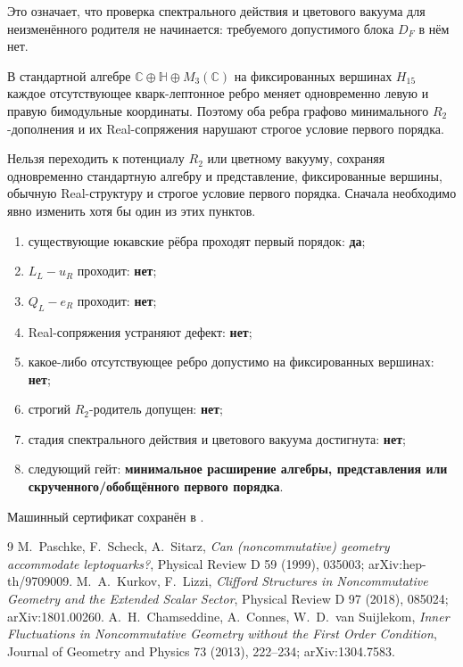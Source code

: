 Это означает, что проверка спектрального действия и цветового вакуума для
неизменённого родителя не начинается: требуемого допустимого блока $D_F$ в
нём нет.

\begin{theorem}
В стандартной алгебре $\mathbb C\oplus\mathbb H\oplus M_3(\mathbb C)$ на
фиксированных вершинах $H_{15}$ каждое отсутствующее кварк-лептонное ребро
меняет одновременно левую и правую бимодульные координаты. Поэтому оба
ребра графово минимального $R_2$-дополнения и их Real-сопряжения нарушают
строгое условие первого порядка.
\end{theorem}

\begin{nogocriterion}
Нельзя переходить к потенциалу $R_2$ или цветному вакууму, сохраняя
одновременно стандартную алгебру и представление, фиксированные вершины,
обычную Real-структуру и строгое условие первого порядка. Сначала необходимо
явно изменить хотя бы один из этих пунктов.
\end{nogocriterion}

\begin{protocol}
\begin{enumerate}
 \item существующие юкавские рёбра проходят первый порядок: \textbf{да};
 \item $L_L-u_R$ проходит: \textbf{нет};
 \item $Q_L-e_R$ проходит: \textbf{нет};
 \item Real-сопряжения устраняют дефект: \textbf{нет};
 \item какое-либо отсутствующее ребро допустимо на фиксированных вершинах:
 \textbf{нет};
 \item строгий $R_2$-родитель допущен: \textbf{нет};
 \item стадия спектрального действия и цветового вакуума достигнута:
 \textbf{нет};
 \item следующий гейт: \textbf{минимальное расширение алгебры,
 представления или скрученного/обобщённого первого порядка}.
\end{enumerate}
\end{protocol}

Машинный сертификат сохранён в
.

\begin{thebibliography}{9}
M.~Paschke, F.~Scheck, A.~Sitarz,
\emph{Can (noncommutative) geometry accommodate leptoquarks?},
Physical Review D 59 (1999), 035003; arXiv:hep-th/9709009.
M.~A.~Kurkov, F.~Lizzi,
\emph{Clifford Structures in Noncommutative Geometry and the Extended Scalar Sector},
Physical Review D 97 (2018), 085024; arXiv:1801.00260.
A.~H.~Chamseddine, A.~Connes, W.~D.~van Suijlekom,
\emph{Inner Fluctuations in Noncommutative Geometry without the First Order Condition},
Journal of Geometry and Physics 73 (2013), 222--234; arXiv:1304.7583.
\end{thebibliography}